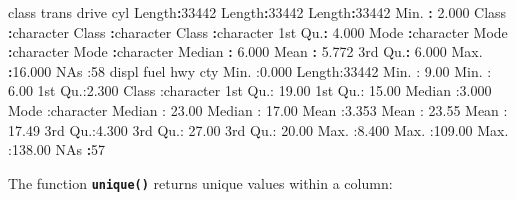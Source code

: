 \documentclass[
]{book}
\newenvironment{Shaded}{\begin{snugshade}}{\end{snugshade}}
\newcommand{\DecValTok}[1]{\textcolor[rgb]{0.00,0.00,0.81}{#1}}
\newcommand{\FloatTok}[1]{\textcolor[rgb]{0.00,0.00,0.81}{#1}}
\newcommand{\NormalTok}[1]{#1}
\newcommand{\SpecialCharTok}[1]{\textcolor[rgb]{0.81,0.36,0.00}{\textbf{#1}}}
\newcommand{\StringTok}[1]{\textcolor[rgb]{0.31,0.60,0.02}{#1}}
\begin{document}
\begin{Shaded}
\begin{Highlighting}[]
\NormalTok{    class              trans              drive                cyl        }
\NormalTok{ Length}\SpecialCharTok{:}\DecValTok{33442}\NormalTok{       Length}\SpecialCharTok{:}\DecValTok{33442}\NormalTok{       Length}\SpecialCharTok{:}\DecValTok{33442}\NormalTok{       Min.   }\SpecialCharTok{:} \FloatTok{2.000}  
\NormalTok{ Class }\SpecialCharTok{:}\NormalTok{character   Class }\SpecialCharTok{:}\NormalTok{character   Class }\SpecialCharTok{:}\NormalTok{character   }\DecValTok{1}\NormalTok{st Qu.}\SpecialCharTok{:} \FloatTok{4.000}  
\NormalTok{ Mode  }\SpecialCharTok{:}\NormalTok{character   Mode  }\SpecialCharTok{:}\NormalTok{character   Mode  }\SpecialCharTok{:}\NormalTok{character   Median }\SpecialCharTok{:} \FloatTok{6.000}  
\NormalTok{                                                          Mean   }\SpecialCharTok{:} \FloatTok{5.772}  
                                                          \DecValTok{3}\NormalTok{rd Qu.}\SpecialCharTok{:} \FloatTok{6.000}  
\NormalTok{                                                          Max.   }\SpecialCharTok{:}\FloatTok{16.000}  
\NormalTok{                                                          NA}\StringTok{\textquotesingle{}s   :58      }
\StringTok{     displ           fuel                hwy              cty        }
\StringTok{ Min.   :0.000   Length:33442       Min.   :  9.00   Min.   :  6.00  }
\StringTok{ 1st Qu.:2.300   Class :character   1st Qu.: 19.00   1st Qu.: 15.00  }
\StringTok{ Median :3.000   Mode  :character   Median : 23.00   Median : 17.00  }
\StringTok{ Mean   :3.353                      Mean   : 23.55   Mean   : 17.49  }
\StringTok{ 3rd Qu.:4.300                      3rd Qu.: 27.00   3rd Qu.: 20.00  }
\StringTok{ Max.   :8.400                      Max.   :109.00   Max.   :138.00  }
\StringTok{ NA\textquotesingle{}}\NormalTok{s   }\SpecialCharTok{:}\DecValTok{57}                                                          
\end{Highlighting}
\end{Shaded}

The function \textbf{\texttt{unique()}} returns unique values within a column:
\end{document}
